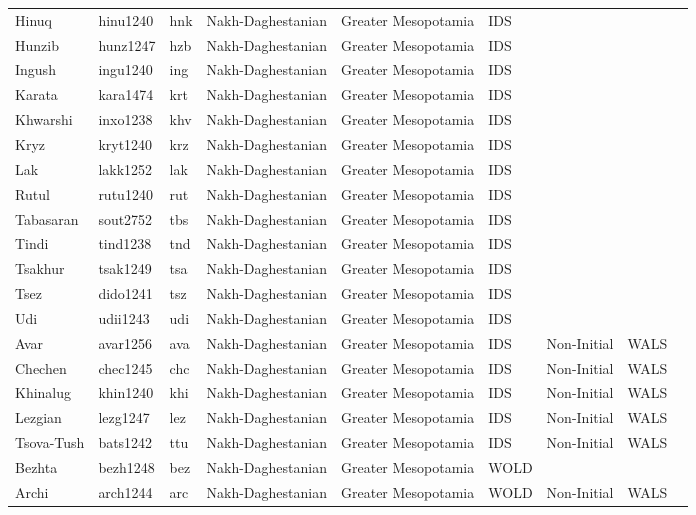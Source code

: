 \begin{longtable}{lllllllll}
  Hinuq & hinu1240 & hnk & Nakh-Daghestanian & Greater Mesopotamia & IDS &  &  &  \\ 
  Hunzib & hunz1247 & hzb & Nakh-Daghestanian & Greater Mesopotamia & IDS &  &  &  \\ 
  Ingush & ingu1240 & ing & Nakh-Daghestanian & Greater Mesopotamia & IDS &  &  &  \\ 
  Karata & kara1474 & krt & Nakh-Daghestanian & Greater Mesopotamia & IDS &  &  &  \\ 
  Khwarshi  & inxo1238 & khv & Nakh-Daghestanian & Greater Mesopotamia & IDS &  &  &  \\ 
  Kryz & kryt1240 & krz & Nakh-Daghestanian & Greater Mesopotamia & IDS &  &  &  \\ 
  Lak & lakk1252 & lak & Nakh-Daghestanian & Greater Mesopotamia & IDS &  &  &  \\ 
  Rutul & rutu1240 & rut & Nakh-Daghestanian & Greater Mesopotamia & IDS &  &  &  \\ 
  Tabasaran  & sout2752 & tbs & Nakh-Daghestanian & Greater Mesopotamia & IDS &  &  &  \\ 
  Tindi & tind1238 & tnd & Nakh-Daghestanian & Greater Mesopotamia & IDS &  &  &  \\ 
  Tsakhur & tsak1249 & tsa & Nakh-Daghestanian & Greater Mesopotamia & IDS &  &  &  \\ 
  Tsez   & dido1241 & tsz & Nakh-Daghestanian & Greater Mesopotamia & IDS &  &  &  \\ 
  Udi & udii1243 & udi & Nakh-Daghestanian & Greater Mesopotamia & IDS &  &  &  \\ 
  Avar & avar1256 & ava & Nakh-Daghestanian & Greater Mesopotamia & IDS & Non-Initial & WALS &  \\ 
  Chechen & chec1245 & chc & Nakh-Daghestanian & Greater Mesopotamia & IDS & Non-Initial & WALS &  \\ 
  Khinalug & khin1240 & khi & Nakh-Daghestanian & Greater Mesopotamia & IDS & Non-Initial & WALS &  \\ 
  Lezgian & lezg1247 & lez & Nakh-Daghestanian & Greater Mesopotamia & IDS & Non-Initial & WALS &  \\ 
  Tsova-Tush & bats1242 & ttu & Nakh-Daghestanian & Greater Mesopotamia & IDS & Non-Initial & WALS &  \\ 
  Bezhta & bezh1248 & bez & Nakh-Daghestanian & Greater Mesopotamia & WOLD &  &  &  \\ 
  Archi & arch1244 & arc & Nakh-Daghestanian & Greater Mesopotamia & WOLD & Non-Initial & WALS &  \\ 

\end{longtable}
